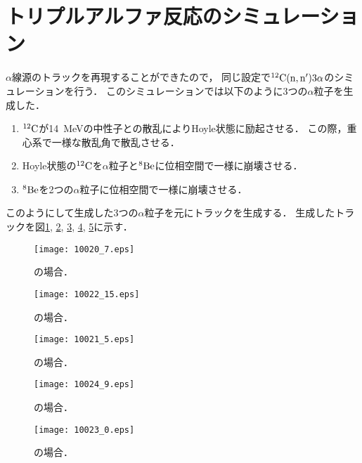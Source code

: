 \documentclass[../master]{subfiles}
\begin{document}
\section{トリプルアルファ反応のシミュレーション}
\label{sec::triple_alpha_simulation}
$\alpha$線源のトラックを再現することができたので，
同じ設定で${}^{12}{\rm C}({\rm n},{\rm n}')3\alpha$のシミュレーションを行う．
このシミュレーションでは以下のように3つの$\alpha$粒子を生成した．
\begin{enumerate}
\item
  ${}^{12}{\rm C}$が\SI{14}{\mega\electronvolt}の中性子との散乱によりHoyle状態に励起させる．
  この際，重心系で一様な散乱角で散乱させる．
\item
  Hoyle状態の${}^{12}{\rm C}$を$\alpha$粒子と${}^{8}{\rm Be}$に位相空間で一様に崩壊させる．
\item
  ${}^{8}{\rm Be}$を2つの$\alpha$粒子に位相空間で一様に崩壊させる．
\end{enumerate}
このようにして生成した3つの$\alpha$粒子を元にトラックを生成する．
生成したトラックを図\ref{fig::three_alpha_ch4}, \ref{fig::three_alpha_ch4_h2}, \ref{fig::three_alpha_ch4_he},
\ref{fig::three_alpha_ic4h10_h2}, \ref{fig::three_alpha_ic4h10_he}に示す．
\begin{figure}
  \centering
  \texttt{[image: 10020\_7.eps]}
  \caption{\Methane の場合．}
  \label{fig::three_alpha_ch4}
\end{figure}
\begin{figure}
  \centering
  \texttt{[image: 10022\_15.eps]}
  \caption{\MethaneHydro の場合．}
  \label{fig::three_alpha_ch4_h2}
\end{figure}
\begin{figure}
  \centering
  \texttt{[image: 10021\_5.eps]}
  \caption{\MethaneHerium の場合．}
  \label{fig::three_alpha_ch4_he}
\end{figure}
\begin{figure}
  \centering
  \texttt{[image: 10024\_9.eps]}
  \caption{\isoButaneHydro の場合．}
  \label{fig::three_alpha_ic4h10_h2}
\end{figure}
\begin{figure}
  \centering
  \texttt{[image: 10023\_0.eps]}
  \caption{\isoButaneHerium の場合．}
  \label{fig::three_alpha_ic4h10_he}
\end{figure}
\end{document}
